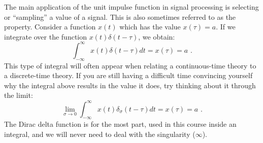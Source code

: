 The main application of the unit impulse function in signal processing is 
selecting or ``sampling'' a value of a signal. This is also sometimes referred to 
as the \emph{} property. Consider a function $x(t)$ which 
has the value $x(\tau) = a$. If we integrate over the function $x(t)\delta(t-\tau)$, 
we obtain:
\begin{equation}
  \int_{-\infty}^{\infty}x(t)\delta(t-\tau) dt = x(\tau) = a\,\,.
\end{equation}
This type of integral will often appear when relating a continuous-time theory to a discrete-time theory.
If you are still having a difficult time convincing yourself why the integral above results 
in the value it does, try thinking about it through the limit:
\begin{equation}
  \lim_{\sigma\rightarrow 0}\int_{-\infty}^{\infty}x(t)\delta_{\sigma}(t-\tau) dt = x(\tau) = a\,\,.
\end{equation}
The Dirac delta function is for the most part, used in this course
inside an integral, and we will never need to deal with the
singularity ($\infty$).

